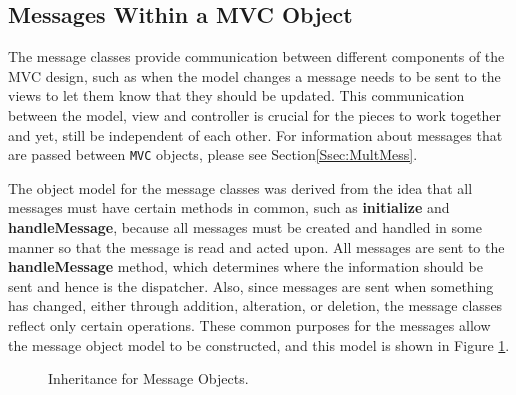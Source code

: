 \documentclass{article}[11pt]
\newcommand{\Rfunction}[1]{{\textbf{#1}}}
\newcommand{\Robject}[1]{{\texttt{#1}}}
\begin{document}
\subsection{Messages Within a MVC Object}\label{Ssec:OneMess}

The message classes provide communication between different
components of the MVC design, such as when the model changes a message needs
to be sent to the views to let them know that they should be updated.  This
communication between the model, view and controller is crucial for the pieces
to work together and yet, still be independent of each other.  For information
about messages that are passed between \Robject{MVC} objects, please see
Section\ref{Ssec:MultMess}. 

The object model for the message classes was derived from the idea
that all messages must have certain methods in common, such as
\Rfunction{initialize} and \Rfunction{handleMessage}, because all
messages must be created and handled in some manner so that the
message is read and acted upon.  All messages are sent to
the \Rfunction{handleMessage} method, which determines where the information
should be sent and hence is the dispatcher.   Also, since messages
are sent when something has changed, either through addition, alteration, or
deletion, the message classes reflect only certain operations.  These
common purposes for the messages allow the message object
model to be constructed, and this model is shown in Figure \ref{Fig:Mess}.

\begin{figure}[ht]
  \begin{center}
    \caption{ Inheritance for Message Objects. }
    \label{Fig:Mess}
  \end{center}
\end{figure}
\end{document}
